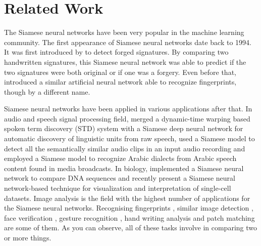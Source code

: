 \section{Related Work}
\label{sec:siamese_related}

The Siamese neural networks have been very popular in the machine learning community. The first appearance of Siamese neural networks date back to 1994. It was first introduced by \citet{doi:10.1142/S0218001493000339} to detect forged signatures. By comparing two handwritten signatures, this Siamese neural network was able to predict if the two signatures were both original or if one was a forgery. Even before that, \citet{6797067} introduced a similar artificial neural network able to recognize fingerprints, though by a different name. 

Siamese neural networks have been applied in various applications after that. In audio and speech signal processing field, \citet{thiolliere2015hybrid} merged a dynamic-time warping based spoken term discovery (STD) system with a Siamese deep neural network for automatic discovery of linguistic units from raw speech, \citet{8461524} used a Siamese model to detect all the semantically similar audio clips in an input audio recording and \citet{8268960} employed a Siamese model to recognize Arabic dialects from Arabic speech content found in media broadcasts. In biology, \citet{10.1093/bioinformatics/bty887} implemented a Siamese neural network to compare DNA sequences and recently \citet{Szubert2019} present a Siamese neural network-based technique for visualization and interpretation of single-cell datasets. Image analysis is the field with the highest number of applications for the Siamese neural networks. Recognising fingerprints \cite{6797067}, similar image detection \cite{1467314,rs10020355,21be1428c6a44fb7a32d49ba83126bcb,6976727,6636646}, face verification \cite{Taigman_2014_CVPR}, gesture recognition \cite{7163112}, hand writing analysis \cite{8269987} and patch matching \cite{HANIF201954} are some of them. As you can observe, all of these tasks involve in comparing two or more things.

